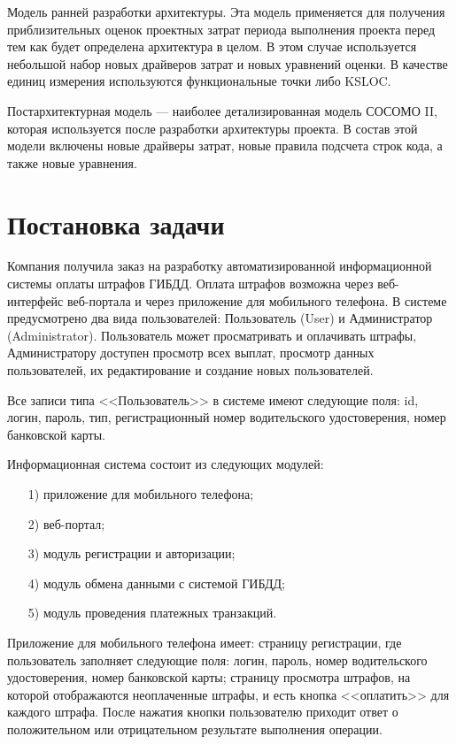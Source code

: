 \documentclass{bmstu}
\begin{document}
Модель ранней разработки архитектуры. 
Эта модель применяется для получения приблизительных оценок проектных затрат периода выполнения проекта перед тем как будет определена архитектура в целом. 
В этом случае используется небольшой набор новых драйверов затрат и новых уравнений оценки. 
В качестве единиц измерения используются функциональные точки либо KSLOC.

Постархитектурная модель --- наиболее детализированная модель СОСОМО II, которая используется после разработки архитектуры проекта. 
В состав этой модели включены новые драйверы затрат, новые правила подсчета строк кода, а также новые уравнения.

\section{Постановка задачи}

Компания получила заказ на разработку автоматизированной информационной системы оплаты штрафов ГИБДД. 
Оплата штрафов возможна через веб-интерфейс веб-портала и через приложение для мобильного телефона. 
В системе предусмотрено два вида пользователей: Пользователь (User) и
Администратор (Administrator). 
Пользователь может просматривать и оплачивать штрафы, Администратору  доступен просмотр всех выплат, просмотр данных пользователей, их редактирование и создание новых пользователей. 

Все записи типа <<Пользователь>> в системе имеют следующие поля: id, логин, пароль, тип, регистрационный номер водительского удостоверения, номер банковской карты.

Информационная система состоит из следующих модулей:
\begin{enumerate}
\item[1)] приложение для мобильного телефона;
\item[2)] веб-портал;
\item[3)] модуль регистрации и авторизации;
\item[4)] модуль обмена данными с системой ГИБДД;
\item[5)] модуль проведения платежных транзакций.
\end{enumerate}

Приложение для мобильного телефона имеет: страницу регистрации, где пользователь заполняет следующие поля: логин, пароль, номер водительского удостоверения, номер банковской карты; страницу просмотра штрафов, на которой отображаются неоплаченные штрафы, и есть кнопка <<оплатить>> для каждого штрафа. 
После нажатия кнопки пользователю приходит ответ о положительном или отрицательном результате выполнения операции.
\end{document}
